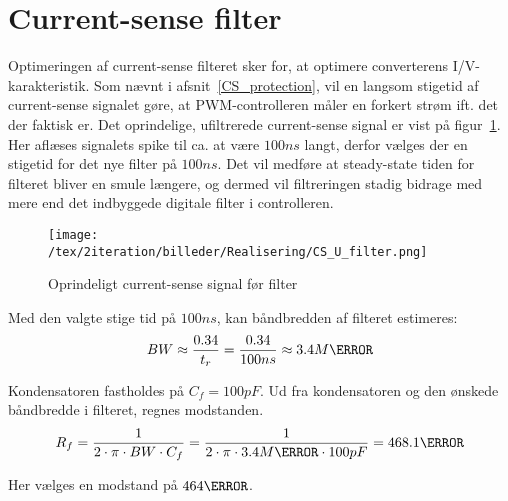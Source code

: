 
\section{Current-sense filter}
Optimeringen af current-sense filteret sker for, at optimere converterens I/V-karakteristik. Som nævnt i afsnit~\ref{CS_protection}, vil en langsom stigetid af current-sense signalet gøre, at PWM-controlleren måler en forkert strøm ift. det der faktisk er. Det oprindelige, ufiltrerede current-sense signal er vist på figur~\ref{fig:CS_U_filter}. Her aflæses signalets spike til ca. at være $100ns$ langt, derfor vælges der en stigetid for det nye filter på $100ns$. Det vil medføre at steady-state tiden for filteret bliver en smule længere, og dermed vil filtreringen stadig bidrage med mere end det indbyggede digitale filter i controlleren.

\begin{figure}[H]
	\center
	\texttt{[image: /tex/2iteration/billeder/Realisering/CS\_U\_filter.png]}
	\caption{Oprindeligt current-sense signal før filter}
	\label{fig:CS_U_filter}
\end{figure}

\noindent Med den valgte stige tid på $100ns$, kan båndbredden af filteret estimeres:
\begin{equation} \label{filter_BW}
BW \approx \frac{0.34}{t_r} = \frac{0.34}{100ns} \approx 3.4M\hertz
\end{equation}

\noindent Kondensatoren fastholdes på $C_f=100pF$. Ud fra kondensatoren og den ønskede båndbredde i filteret, regnes modstanden.
\begin{equation} \label{filter_R}
R_f = \frac{1}{2 \cdot \pi \cdot BW \cdot C_f} = \frac{1}{2 \cdot \pi \cdot 3.4M\hertz \cdot 100pF} = 468.1\ohm
\end{equation}

\noindent Her vælges en modstand på $464\ohm$.




